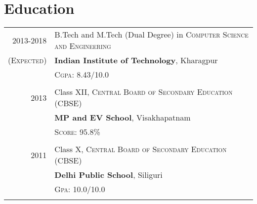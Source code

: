 \documentclass[a4paper,10pt]{article} %
\begin{document}



\section{Education}

\begin{tabular}{r|p{15cm}}	
2013-2018 & B.Tech and M.Tech (Dual Degree) in \textsc{Computer Science and Engineering}\\
\textsc{(Expected)}&\textbf{Indian Institute of Technology}, Kharagpur\\
&\normalsize \textsc{Cgpa}: 8.43/10.0\\
&\\


2013& Class XII, \textsc{}\textsc{Central Board of Secondary Education (CBSE)} \\
&\normalsize\textbf{MP and EV School}, Visakhapatnam\\
&\normalsize \textsc{Score}: 95.8\%\\
&\\


2011 & Class X, \textsc{}\textsc{Central Board of Secondary Education (CBSE)} \\
&\normalsize\textbf{Delhi Public School}, Siliguri\\
& \textsc{Gpa}: 10.0/10.0\\
&\\

\end{tabular}
\end{document}

